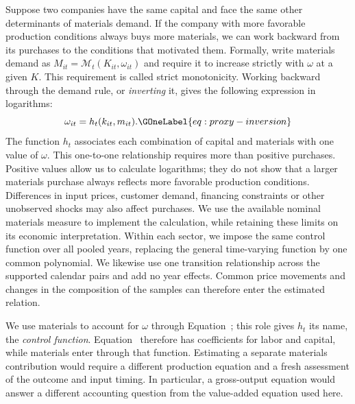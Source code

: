 Suppose two companies have the same capital and face the same other determinants of materials demand. If the company with more favorable production conditions always buys more materials, we can work backward from its purchases to the conditions that motivated them. Formally, write materials demand as $M_{it}=\mathcal M_t(K_{it},\omega_{it})$ and require it to increase strictly with $\omega$ at a given $K$. This requirement is called strict monotonicity. Working backward through the demand rule, or \emph{inverting} it, gives the following expression in logarithms:
\begin{equation}
\omega_{it}=h_t(k_{it},m_{it}).
\GOneLabel{eq:proxy-inversion}
\end{equation}
The function $h_t$ associates each combination of capital and materials with one value of $\omega$. This one-to-one relationship requires more than positive purchases. Positive values allow us to calculate logarithms; they do not show that a larger materials purchase always reflects more favorable production conditions. Differences in input prices, customer demand, financing constraints or other unobserved shocks may also affect purchases. We use the available nominal materials measure to implement the calculation, while retaining these limits on its economic interpretation. Within each sector, we impose the same control function over all pooled years, replacing the general time-varying function by one common polynomial. We likewise use one transition relationship across the supported calendar pairs and add no year effects. Common price movements and changes in the composition of the samples can therefore enter the estimated relation.

We use materials to account for $\omega$ through Equation~; this role gives $h_t$ its name, the \emph{control function}. Equation~ therefore has coefficients for labor and capital, while materials enter through that function. Estimating a separate materials contribution would require a different production equation and a fresh assessment of the outcome and input timing. In particular, a gross-output equation would answer a different accounting question from the value-added equation used here.

